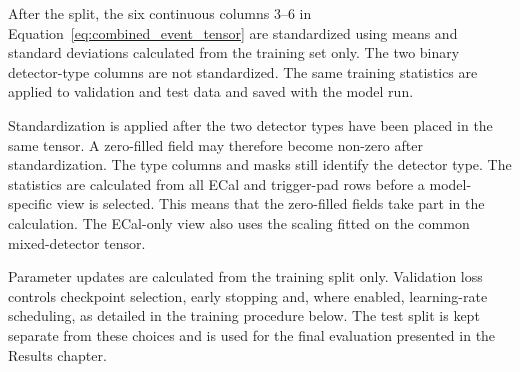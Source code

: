 After the split, the six continuous columns 3--6 in
Equation~\eqref{eq:combined_event_tensor} are standardized using means and
standard deviations calculated from the training set only. The two binary
detector-type columns are not standardized. The same training statistics are
applied to validation and test data and saved with the model run.

Standardization is applied after the two detector types have been placed in
the same tensor. A zero-filled field may therefore become non-zero after
standardization. The type columns and masks still identify the detector type.
The statistics are calculated from all ECal and trigger-pad rows before a
model-specific view is selected. This means that the zero-filled fields take
part in the calculation. The ECal-only view also uses the scaling fitted on
the common mixed-detector tensor.

Parameter updates are calculated from the training split only. Validation
loss controls checkpoint selection, early stopping and, where enabled,
learning-rate scheduling, as detailed in the training procedure below. The
test split is kept separate from these choices and is used for the final
evaluation presented in the Results chapter.













